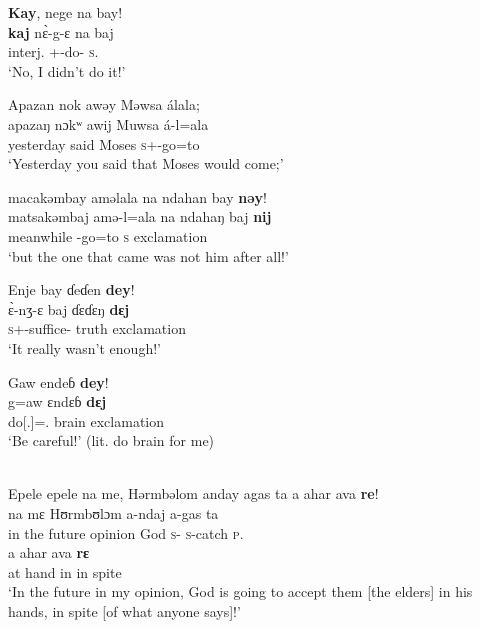 \ea \label{ex:10:118}
\textbf{Kay},  nege  na  bay!\\
\gll  \textbf{kaj}    n\`{ɛ}-g-ɛ    na  baj\\
      interj.  {\oneS}+{\PFV}-do-{\CL}  \textsc{s}.{\DO}  {\NEG}\\
\glt  ‘No, I didn’t do it!’
\z  

\ea \label{ex:10:119}
Apazan  nok  awəy  Məwsa  álala;\\  
\gll  apazaŋ   nɔkʷ  awij  Muwsa  á-l=ala \\ 
      yesterday  {\twoS}  said  Moses  \textsc{s}+{\IFV}-go=to \\     
\glt ‘Yesterday you said that Moses would come;’      
      
   \medskip
macakəmbay  aməlala  na  ndahan  bay  \textbf{nəy}!\\   
\gll matsakəmbaj amə-l=ala  na ndahaŋ baj \textbf{nij}\\
     meanwhile    {\DEP}-go=to  {\PSP}  \textsc{s}  {\NEG}  exclamation\\
\glt  ‘but the one that came was not him after all!’
\z 

\ea \label{ex:10:120}
Enje  bay  ɗeɗen  \textbf{dey}!\\
\gll  \`{ɛ}{}-nʒ-ɛ    baj  ɗɛɗɛŋ  \textbf{dɛj}\\
      \textsc{s}+{\PFV}-suffice-{\CL}  {\NEG}  truth  exclamation\\
\glt  ‘It really wasn’t enough!’
\z  

\ea \label{ex:10:121}
Gaw  endeɓ  \textbf{dey}!\\
\gll  g=aw     ɛndɛɓ   \textbf{dɛj}\\
      do[{\twoS}.{\IMP}]={\oneS}.{\IO}  brain  exclamation\\
\glt  ‘Be careful!’ (lit. do brain for me)
\z 

\ea \label{ex:10:122}
\\
Epele  epele  na me,  Hərmbəlom  anday  agas  ta  a  ahar  ava \textbf{re}!\\
   na   mɛ  Hʊrmbʊlɔm   a-ndaj   a-gas         ta   \\  
      {\ID}{in the future}  {\PSP}  opinion    God      \textsc{s}-{\PROG}  \textsc{s}-catch    \textsc{p}.{\DO}  \\   
      
      \medskip
\gll a   ahar  ava \textbf{rɛ}\\
     at  hand  in {in spite}\\
\glt  ‘In the future in my opinion, God is going to accept them [the elders] in his hands, in spite [of what anyone says]!’
\z 
